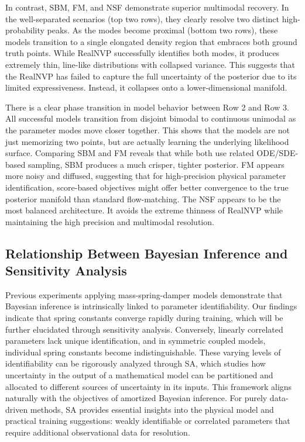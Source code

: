 In contrast, \ac{SBM}, \ac{FM}, and \ac{NSF} demonstrate superior multimodal recovery. In the well-separated scenarios (top two rows), they clearly resolve two distinct high-probability peaks. As the modes become proximal (bottom two rows), these models transition to a single elongated density region that embraces both ground truth points. While \ac{RealNVP} successfully identifies both modes, it produces extremely thin, line-like distributions with collapsed variance. This suggests that the \ac{RealNVP} has failed to capture the full uncertainty of the posterior due to its limited expressiveness. Instead, it collapses onto a lower-dimensional manifold.

There is a clear phase transition in model behavior between Row 2 and Row 3. All successful models transition from disjoint bimodal to continuous unimodal as the parameter modes move closer together. This shows that the models are not just memorizing two points, but are actually learning the underlying likelihood surface. Comparing \ac{SBM} and \ac{FM} reveals that while both use related ODE/SDE-based sampling, \ac{SBM} produces a much crisper, tighter posterior. \ac{FM} appears more noisy and diffused, suggesting that for high-precision physical parameter identification, score-based objectives might offer better convergence to the true posterior manifold than standard flow-matching. The \ac{NSF} appears to be the most balanced architecture. It avoids the extreme thinness of \ac{RealNVP} while maintaining the high precision and multimodal resolution.

\subsection{Relationship Between Bayesian Inference and Sensitivity Analysis}
Previous experiments applying mass-spring-damper models demonstrate that Bayesian inference is intrinsically linked to parameter identifiability. Our findings indicate that spring constants converge rapidly during training, which will be further elucidated through sensitivity analysis. Conversely, linearly correlated parameters lack unique identification, and in symmetric coupled models, individual spring constants become indistinguishable. These varying levels of identifiability can be rigorously analyzed through \ac{SA}, which studies how uncertainty in the output of a mathematical model can be partitioned and allocated to different sources of uncertainty in its inputs. This framework aligns naturally with the objectives of amortized Bayesian inference. For purely data-driven methods, \ac{SA} provides essential insights into the physical model and practical training suggestions: weakly identifiable or correlated parameters that require additional observational data for resolution.

